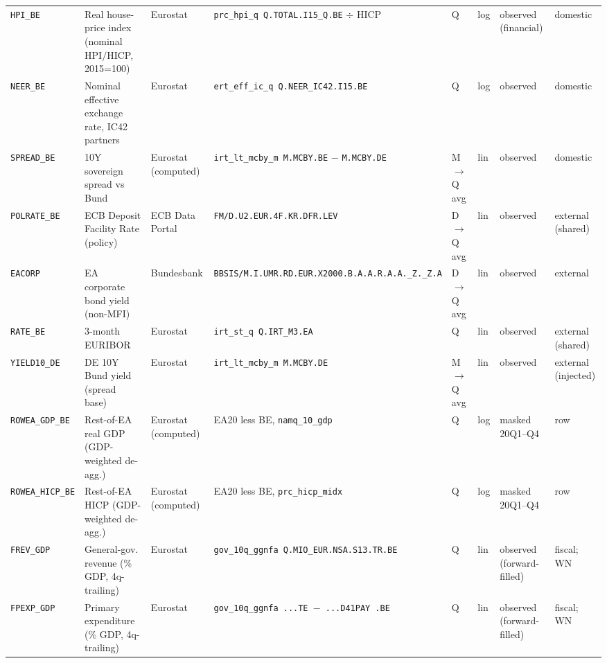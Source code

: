 \begin{longtable}{@{}p{}p{}p{}p{}p{}p{}p{}p{}@{}}
\texttt{HPI\_BE}    & Real house-price index (nominal HPI$/$HICP, 2015=100) & Eurostat & \texttt{prc\_hpi\_q Q.\allowbreak TOTAL.\allowbreak I15\_Q.\allowbreak BE} $\div$ HICP & Q & log & observed (financial) & domestic \\
\texttt{NEER\_BE}   & Nominal effective exchange rate, IC42 partners & Eurostat & \texttt{ert\_eff\_ic\_q Q.\allowbreak NEER\_IC42.\allowbreak I15.\allowbreak BE} & Q & log & observed & domestic \\
\texttt{SPREAD\_BE} & 10Y sovereign spread vs Bund & Eurostat (computed) & \texttt{irt\_lt\_mcby\_m M.\allowbreak MCBY.\allowbreak BE} $-$ \texttt{M.\allowbreak MCBY.\allowbreak DE} & M$\to$Q avg & lin & observed & domestic \\
\texttt{POLRATE\_BE}& ECB Deposit Facility Rate (policy) & ECB Data Portal & \texttt{FM/D.\allowbreak U2.\allowbreak EUR.4F.\allowbreak KR.\allowbreak DFR.\allowbreak LEV} & D$\to$Q avg & lin & observed & external (shared) \\
\texttt{EACORP}     & EA corporate bond yield (non-MFI) & Bundesbank & \texttt{BBSIS/\allowbreak M.\allowbreak I.\allowbreak UMR.\allowbreak RD.\allowbreak EUR.\allowbreak X2000.\allowbreak B.A.A.\allowbreak R.A.A.\allowbreak \_Z.\_Z.A} & D$\to$Q avg & lin & observed & external \\
\texttt{RATE\_BE}   & 3-month EURIBOR & Eurostat & \texttt{irt\_st\_q Q.\allowbreak IRT\_M3.\allowbreak EA} & Q & lin & observed & external (shared) \\
\texttt{YIELD10\_DE}& DE 10Y Bund yield (spread base) & Eurostat & \texttt{irt\_lt\_mcby\_m M.\allowbreak MCBY.\allowbreak DE} & M$\to$Q avg & lin & observed & external (injected) \\
\texttt{ROWEA\_GDP\_BE}  & Rest-of-EA real GDP (GDP-weighted de-agg.) & Eurostat (computed) & EA20 less BE, \texttt{namq\_10\_gdp} & Q & log & masked 20Q1--Q4 & row \\
\texttt{ROWEA\_HICP\_BE} & Rest-of-EA HICP (GDP-weighted de-agg.) & Eurostat (computed) & EA20 less BE, \texttt{prc\_hicp\_midx} & Q & log & masked 20Q1--Q4 & row \\
\texttt{FREV\_GDP}  & General-gov. revenue (\% GDP, 4q-trailing) & Eurostat & \texttt{gov\_10q\_ggnfa Q.\allowbreak MIO\_EUR.\allowbreak NSA.\allowbreak S13.\allowbreak TR.\allowbreak BE} & Q & lin & observed (forward-filled) & fiscal; WN \\
\texttt{FPEXP\_GDP} & Primary expenditure (\% GDP, 4q-trailing) & Eurostat & \texttt{gov\_10q\_ggnfa ...\allowbreak TE $-$ ...\allowbreak D41PAY .\allowbreak BE} & Q & lin & observed (forward-filled) & fiscal; WN \\

\end{longtable}

